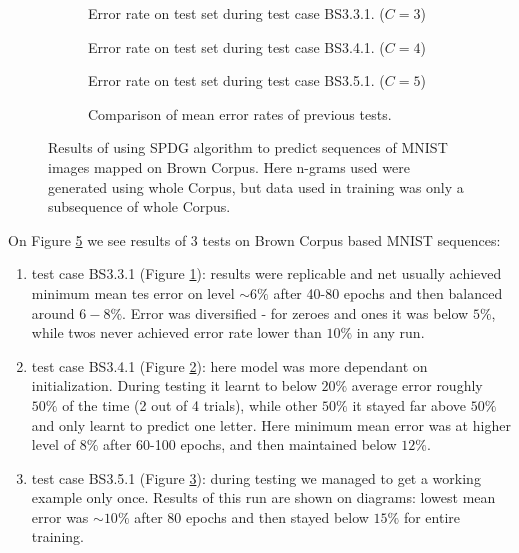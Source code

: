 \documentclass[shortabstract,lic,english]{iithesis}
\begin{document}
\begin{figure}[ht]
\begin{subfigure}[b]{.49\textwidth}
    \def\svgwidth{\textwidth}
    
    \caption{Error rate on test set during test case BS3.3.1. ($C=3$)}
    \label{fig:tbs331_test_error}
\end{subfigure}
\begin{subfigure}[b]{.49\textwidth}
    \def\svgwidth{\textwidth}
    
    \caption{Error rate on test set during test case BS3.4.1. ($C=4$)}
    \label{fig:tbs341_test_error}
\end{subfigure}
\begin{subfigure}[b]{.49\textwidth}
    \def\svgwidth{\textwidth}
    
    \caption{Error rate on test set during test case BS3.5.1. ($C=5$)}
    \label{fig:tbs351_test_error}
\end{subfigure}
\begin{subfigure}[b]{.49\textwidth}
    \def\svgwidth{\textwidth}
    
    \caption{Comparison of mean error rates of previous tests.}
    \label{fig:tbs3(345)1_mean_test_error}
\end{subfigure}
\caption{Results of using SPDG algorithm to predict sequences of MNIST images mapped on Brown Corpus. Here n-grams 
used were generated using whole Corpus, but data used in training was only a subsequence of whole Corpus.}
\label{fig:tbs1_results}
\end{figure}

On Figure \ref{fig:tbs1_results} we see results of 3 tests on Brown Corpus based MNIST sequences:
\begin{enumerate}
\item test case BS3.3.1 (Figure \ref{fig:tbs331_test_error}): results were replicable and net usually achieved minimum mean tes error on level $\sim6\%$ after 40-80 epochs and then balanced around $6-8\%$. Error was diversified - for zeroes and ones it was below $5\%$, while twos never achieved error rate lower than $10\%$ in any run.
\item test case BS3.4.1 (Figure \ref{fig:tbs341_test_error}): here model was more dependant on initialization. During testing it learnt to below $20\%$ average error roughly $50\%$ of the time (2 out of 4 trials), while other $50\%$ it stayed far above $50\%$ and only learnt to predict one letter. Here minimum mean error was at higher level of $8\%$ after 60-100 epochs, and then maintained below $12\%$.
\item test case BS3.5.1 (Figure \ref{fig:tbs351_test_error}): during testing we managed to get a working example only once. Results of this run are shown on diagrams: lowest mean error was $\sim 10\%$ after 80 epochs and then stayed below $15\%$ for entire training.
\end{enumerate}
\end{document}
